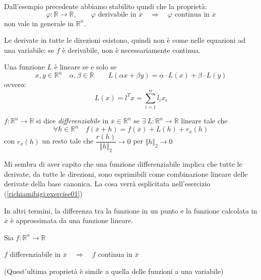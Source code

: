 Dall'esempio precedente abbiamo stabilito qundi che la propriet\`a:
$$ 
\varphi: \mathbb{R} \rightarrow \mathbb{R},  \qquad 
\varphi \text{ derivabile in } \overline{x}
\quad
\Longrightarrow
\quad
\varphi \text{ continua in } \overline{x}
$$
non vale in generale in $\mathbb{R}^{n}$.

\begin{notes}
Le derivate in tutte le direzioni esistono, quindi non è come nelle
equazioni ad una variabile: se $f$ è derivabile, non è 
necessariamente continua.
\end{notes}


\begin{defn}
Una funzione $L$ è lineare se e solo se
$$
x,y \in \mathbb{R}^n  \quad  \alpha,  \beta \in \mathbb{R}
\qquad L(\alpha x + \beta y) = \alpha \cdot L(x) + \beta \cdot L(y) 
$$
ovvero:
$$
L(x) = l^T x = \sum_{i=1}^{n}l_i x_i
$$
\end{defn}

\begin{defn}
$f: \mathbb{R}^n \to \mathbb{R}$ si dice \emph{differenziabile} 
in $\overline{x} \in \mathbb{R}^n$ se $\exists ~ L: \mathbb{R}^n \to \mathbb{R}$
lineare tale che
$$\forall h \in \mathbb{R}^n 
\quad 
 f(\overline{x}+h)=f(\overline{x}) + L(h) + r_{\overline{x}}(h)$$
con $r_{\overline{x}}(h)$ un resto tale che  $\dfrac{r(h)}{\Vert h\Vert_2} \to 0 $ per  $ \Vert h\Vert_2 \to 0$
\end{defn}

\begin{openquestion}
 Mi sembra di aver capito che una funzione differenziabile
implica che tutte le derivate, da tutte le direzioni, sono
esprimibili come combinazione lineare delle derivate della
base canonica. La cosa verr\`a esplicitata nell'esercizio
(\ref{richiamibigi:exercise01})
\end{openquestion}
In altri termini, la differenza tra la funzione in un punto e la
funzione calcolata in $\overline{x}$ è approssimata da una funzione lineare.

\begin{property}
Sia $f:\mathbb{R}^n \rightarrow \mathbb{R}$

$f$ differenziabile in $\overline{x} \quad \Longrightarrow \quad f$
 continua in $\overline{x}$
\end{property}
 
\begin{notes}
(Quest'ultima proprietà è simile a quella delle funzioni a una variabile)  
\end{notes}

